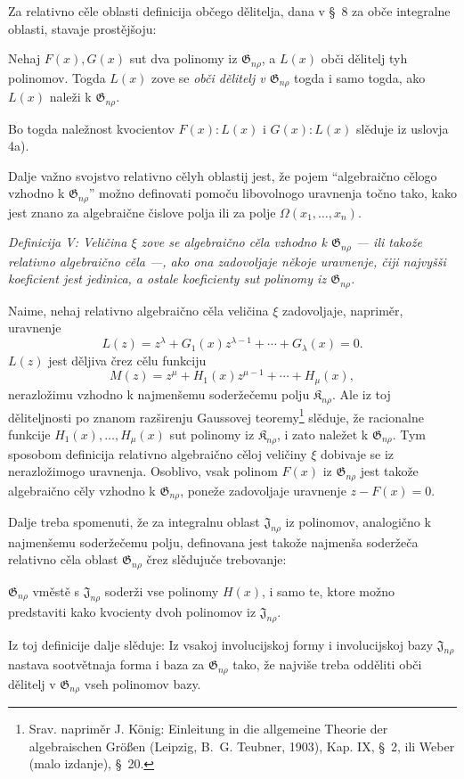 \documentclass[11pt]{article}
\providecommand{\Kfield}{\mathfrak{K}}
\providecommand{\Jdom}{\mathfrak{J}}
\providecommand{\Gdom}{\mathfrak{G}}
\begin{document}
Za relativno cěle oblasti definicija občego dělitelja, dana v \S\ 8 za obče integralne oblasti, stavaje prostějšoju:

Nehaj $F(x),G(x)$ sut dva polinomy iz $\Gdom_{n\rho}$, a $L(x)$ obči dělitelj tyh polinomov. Togda $L(x)$ zove se \emph{obči dělitelj v $\Gdom_{n\rho}$} togda i samo togda, ako $L(x)$ naleži k $\Gdom_{n\rho}$.

Bo togda naležnost kvocientov $F(x):L(x)$ i $G(x):L(x)$ slěduje iz uslovja 4a).

Dalje važno svojstvo relativno cělyh oblastij jest, že pojem ``algebraično cělogo vzhodno k $\Gdom_{n\rho}$'' možno definovati pomoču libovolnogo uravnenja točno tako, kako jest znano za algebraične čislove polja ili za polje $\Omega(x_1,\ldots,x_n)$.

{\itshape Definicija V: Veličina $\xi$ zove se algebraično cěla vzhodno k $\Gdom_{n\rho}$ --- ili takože relativno algebraično cěla ---, ako ona zadovoljaje někoje uravnenje, čiji najvyšši koeficient jest jedinica, a ostale koeficienty sut polinomy iz $\Gdom_{n\rho}$.}

Naime, nehaj relativno algebraično cěla veličina $\xi$ zadovoljaje, napriměr, uravnenje
\[
  L(z)=z^\lambda+G_1(x)z^{\lambda-1}+\cdots+G_\lambda(x)=0.
\]
$L(z)$ jest děljiva črez cělu funkciju
\[
  M(z)=z^\mu+H_1(x)z^{\mu-1}+\cdots+H_\mu(x),
\]
nerazložimu vzhodno k najmenšemu soderžečemu polju $\Kfield_{n\rho}$. Ale iz toj děliteljnosti po znanom razširenju Gaussovej teoremy\footnote{Srav. napriměr J. König: Einleitung in die allgemeine Theorie der algebraischen Größen (Leipzig, B.~G. Teubner, 1903), Kap. IX, \S\ 2, ili Weber (malo izdanje), \S\ 20.} slěduje, že racionalne funkcije $H_1(x),\ldots,H_\mu(x)$ sut polinomy iz $\Kfield_{n\rho}$, i zato naležet k $\Gdom_{n\rho}$. Tym sposobom definicija relativno algebraično cěloj veličiny $\xi$ dobivaje se iz nerazložimogo uravnenja. Osoblivo, vsak polinom $F(x)$ iz $\Gdom_{n\rho}$ jest takože algebraično cěly vzhodno k $\Gdom_{n\rho}$, poneže zadovoljaje uravnenje $z-F(x)=0$.

Dalje treba spomenuti, že za integralnu oblast $\Jdom_{n\rho}$ iz polinomov, analogično k najmenšemu soderžečemu polju, definovana jest takože najmenša soderžeča relativno cěla oblast $\Gdom_{n\rho}$ črez slědujuče trebovanje:

$\Gdom_{n\rho}$ vměstě s $\Jdom_{n\rho}$ soderži vse polinomy $H(x)$, i samo te, ktore možno predstaviti kako kvocienty dvoh polinomov iz $\Jdom_{n\rho}$.

Iz toj definicije dalje slěduje: Iz vsakoj involucijskoj formy i involucijskoj bazy $\Jdom_{n\rho}$ nastava sootvětnaja forma i baza za $\Gdom_{n\rho}$ tako, že najviše treba odděliti obči dělitelj v $\Gdom_{n\rho}$ vseh polinomov bazy.
\end{document}
